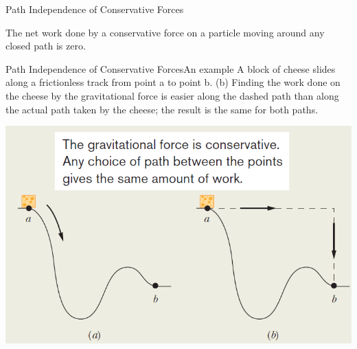 \documentclass[18pt]{LectMechanics}
\begin{document}
\begin{frame}{Path Independence of Conservative Forces}{}
\begin{minipage}{0.5\linewidth}
\begin{center}
		\end{center}
	\end{minipage}
	\begin{boxedframe}
		The net work done by a conservative force on a particle moving around any closed path is zero.
	\end{boxedframe}
\end{frame}

\begin{frame}{Path Independence of Conservative Forces}{An example}
	A block of cheese slides along a frictionless track
	from point a to point b. (b) Finding the work done on the cheese by
	the gravitational force is easier along the dashed path than along
	the actual path taken by the cheese; the result is the same for
	both paths.
	\begin{center}
		\includegraphics[width=0.7\linewidth]{PathIndependentWork}
	\end{center}
\end{frame}
\end{document}
